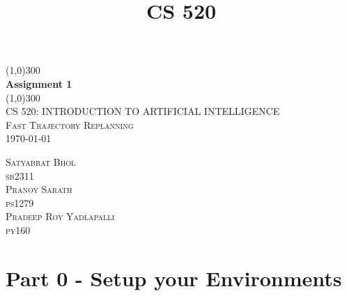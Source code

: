 \documentclass{article}
\title{CS 520}
\begin{document}
\begin{titlepage}
	\begin{center}
    \line(1,0){300}\\
    [0.65cm]
	\huge{\bfseries Assignment 1}\\
	\line(1,0){300}\\
	\textsc{\Large CS 520: INTRODUCTION TO ARTIFICIAL INTELLIGENCE \\ Fast Trajectory Replanning}\\
	\textsc{\LARGE \today}\\
	[5.5cm]     
	\end{center}
	\begin{flushright}
		\textsc{\Large Satyabrat Bhol\\sb2311}\\
		[0.5cm]
		\textsc{\Large Pranoy Sarath\\ps1279}\\
		[0.5cm]
            \textsc{\Large Pradeep Roy Yadlapalli\\py160}\\
		[0.5cm]
	\end{flushright}
\end{titlepage}


\section*{Part 0 - Setup your Environments}
\end{document}
